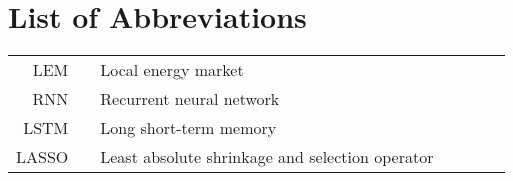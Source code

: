 \section*{List of Abbreviations}

\begin{tabular}{rp{0.2cm}lp{1cm}rp{0.2cm}l}
    LEM     & &  Local energy market           \\
    RNN     & &  Recurrent neural network      \\
    LSTM    & &  Long short-term memory        \\
    LASSO   & &  Least absolute shrinkage and selection operator
\end{tabular}
